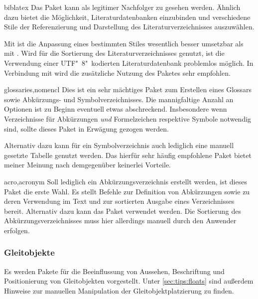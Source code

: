 \begin{packages}
\item[biblatex]
  Das Paket kann als legitimer Nachfolger zu  gesehen werden. 
  Ähnlich dazu bietet  die Möglichkeit, Literaturdatenbanken 
  einzubinden und verschiedene Stile der Referenzierung und Darstellung des 
  Literaturverzeichnisses auszuwählen. 
  
  Mit  ist die Anpassung eines bestimmten Stiles wesentlich 
  besser umsetzbar als mit . Wird  für die 
  Sortierung des Literaturverzeichnisses genutzt, ist die Verwendung einer 
  UTF"~8"~kodierten Literaturdatenbank problemlos möglich. In Verbindung mit 
   wird die zusätzliche Nutzung des Paketes 
   sehr empfohlen.
\item[glossaries,nomencl]
  Dies ist ein sehr mächtiges Paket zum Erstellen eines Glossars sowie 
  Abkürzungs- und Symbolverzeichnisses. Die mannigfaltige Anzahl an Optionen 
  ist zu Beginn eventuell etwas abschreckend. Insbesondere wenn Verzeichnisse 
  für Abkürzungen \emph{und} Formelzeichen respektive Symbole notwendig sind, 
  sollte dieses Paket in Erwägung gezogen werden.
  
  Alternativ dazu kann für ein Symbolverzeichnis auch lediglich eine manuell 
  gesetzte Tabelle genutzt werden. Das hierfür sehr häufig empfohlene Paket 
   bietet meiner Meinung nach demgegenüber keinerlei Vorteile.
\item[acro,acronym]
  Soll lediglich ein Abkürzungsverzeichnis erstellt werden, ist dieses Paket 
  die erste Wahl. Es stellt Befehle zur Definition von Abkürzungen sowie zu 
  deren Verwendung im Text und zur sortierten Ausgabe eines Verzeichnisses 
  bereit. Alternativ dazu kann das Paket  verwendet werden. 
  Die Sortierung des Abkürzungsverzeichnisses muss hier allerdings manuell 
  durch den Anwender erfolgen.
%
\end{packages}


\subsubsection{Gleitobjekte}
%
%
Es werden Pakete für die Beeinflussung von Aussehen, Beschriftung und 
Positionierung von Gleitobjekten vorgestellt. Unter \autoref{sec:tips:floats} 
sind außerdem Hinweise zur manuellen Manipulation der Gleitobjektplatzierung zu 
finden.

